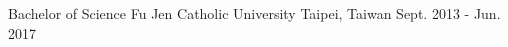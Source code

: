 
\begin{cventries}
  \cventry
    {Bachelor of Science} %
    {Fu Jen Catholic University
    } %
    {\color{gray}Taipei, Taiwan} %
    {Sept. 2013 - Jun. 2017} %
    {}
\end{cventries}
